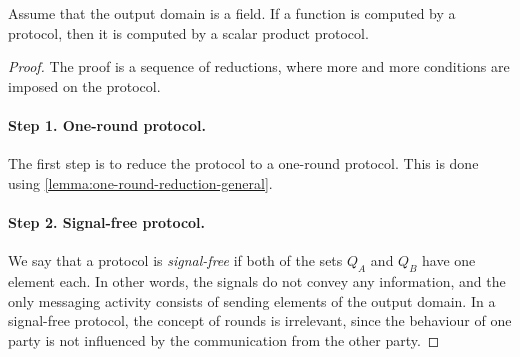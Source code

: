 \begin{lemma}\label{lem:scalar-product-reduction}
    Assume that the output domain is a field. 
    If a function is computed by a protocol, then it is computed by a scalar product protocol.
\end{lemma}
\begin{proof}
    The proof is a sequence of reductions, where more and more conditions are imposed on the protocol.  
    
    \paragraph*{Step 1. One-round protocol.} The first step is to reduce the protocol to a one-round protocol. This is done using \cref{lemma:one-round-reduction-general}.



 \paragraph*{Step 2. Signal-free protocol.}  We say that a protocol is \emph{signal-free} if both of the sets $Q_A$ and $Q_B$ have one element each. In other words, the signals do not convey any information, and the only messaging activity consists of sending elements of the output domain. In a signal-free protocol, the concept of rounds is irrelevant, since the behaviour of one party is not influenced by the communication from the other party.


\end{proof}
